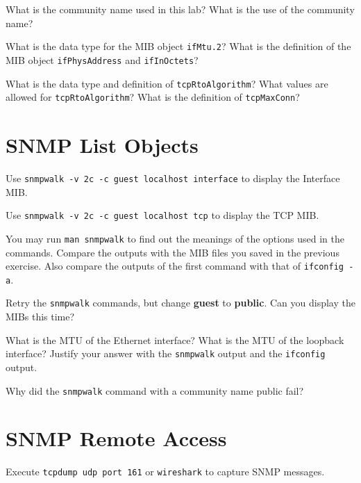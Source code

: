 \documentclass{../UTNetLab}
\begin{document}
    \begin{report}
    \item What is the community name used in this lab? What is the use of the
    community name?
    
    \item What is the data type for the MIB object \texttt{ifMtu.2}? What is the definition of the MIB object \texttt{ifPhysAddress} and \texttt{ifInOctets}?
    
    \item What is the data type and definition of \texttt{tcpRtoAlgorithm}? What values are allowed for \texttt{tcpRtoAlgorithm}? What is the definition of \texttt{tcpMaxConn}?
    \end{report}

\section{SNMP List Objects}
    Use \lstinline[emph=guest]{snmpwalk -v 2c -c guest localhost interface} to display the Interface MIB.

    Use \lstinline[emph=guest]{snmpwalk -v 2c -c guest localhost tcp} to display the TCP MIB.

    You may run \lstinline{man snmpwalk} to find out the meanings of the options used in the commands.
    Compare the outputs with the MIB files you saved in the previous exercise.
    Also compare the outputs of the first command with that of \lstinline{ifconfig -a}.

    Retry the \lstinline{snmpwalk} commands, but change \textbf{guest} to \textbf{public}.
    Can you display the MIBs this time?
    
    \begin{report}
    \item What is the MTU of the Ethernet interface? What is the MTU of the loopback interface? Justify your answer with the \lstinline{snmpwalk} output and the \lstinline{ifconfig} output.
    
    \item Why did the \lstinline{snmpwalk} command with a community name public fail?
    \end{report}

\section{SNMP Remote Access}
    Execute \lstinline{tcpdump udp port 161} or \lstinline{wireshark} to capture SNMP messages.
\end{document}
